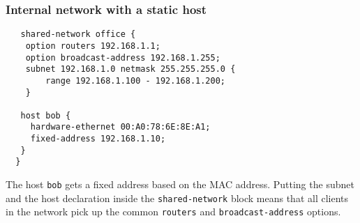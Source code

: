 \documentclass[10pt]{beamer}
\begin{document}
\begin{frame}[fragile]
  \frametitle{Internal network with a static host}
  \begin{verbatim}
   shared-network office {
    option routers 192.168.1.1;
    option broadcast-address 192.168.1.255;
    subnet 192.168.1.0 netmask 255.255.255.0 {
        range 192.168.1.100 - 192.168.1.200;
    }

   host bob {
     hardware-ethernet 00:A0:78:6E:8E:A1;
     fixed-address 192.168.1.10;
   }
  }
  \end{verbatim}  

  The host \texttt{bob} gets a fixed address based on the MAC address.  Putting
  the subnet and the host declaration inside the \texttt{shared-network} block
  means that all clients in the network pick up the common \texttt{routers} and  \texttt{broadcast-address} options.  

\end{frame}
\end{document}
